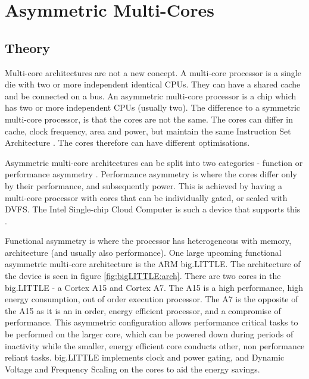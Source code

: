 
\section{Asymmetric Multi-Cores}

\subsection{Theory}
Multi-core architectures are not a new concept. 
A multi-core processor is a single die with two or more independent identical CPUs. 
They can have a shared cache and be connected on a bus.
An asymmetric multi-core processor is a chip which has two or more independent CPUs (usually two).
The difference to a symmetric multi-core processor, is that the cores are not the same. 
The cores can differ in cache, clock frequency, area and power, but maintain the same Instruction Set Architecture \cite{de2012power}.
The cores therefore can have different optimisations.


Asymmetric multi-core architectures can be split into two categories - function or performance asymmetry \cite{wang2012energy}.
Performance asymmetry is where the cores differ only by their performance, and subsequently power. 
This is achieved by having a multi-core processor with cores that can be individually gated, or scaled with DVFS.
The Intel Single-chip Cloud Computer is such a device that supports this \cite{IntelSCC}.

Functional asymmetry is where the processor has heterogeneous with memory, architecture (and usually also performance).
One large upcoming functional asymmetric multi-core architecture is the ARM big.LITTLE. 
The architecture of the device is seen in figure \ref{fig:bigLITTLE:arch}.
There are two cores in the big.LITTLE - a Cortex A15 and Cortex A7.
The A15 is a high performance, high energy consumption, out of order execution processor.
The A7 is the opposite of the A15 as it is an in order, energy efficient processor, and a compromise of performance.
This asymmetric configuration allows performance critical tasks to be performed on the larger core, which can be powered down during periods of inactivity while the smaller, energy efficient core conducts other, non performance reliant tasks.
big.LITTLE implements clock and power gating, and Dynamic Voltage and Frequency Scaling on the cores to aid the energy savings.


